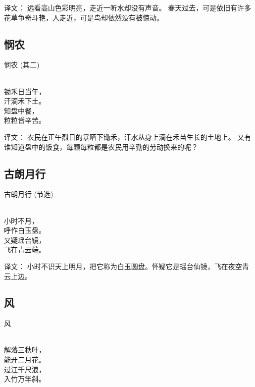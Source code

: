译文：
远看高山色彩明亮，走近一听水却没有声音。
春天过去，可是依旧有许多花草争奇斗艳，人走近，可是鸟却依然没有被惊动。

\subsection{悯农}
\begin{pinyinscope}
	\noindent \huge 悯农 {\kaishu \large (其二) }
	
	 \\
	
	\noindent 锄禾日当午，\\汗滴禾下土。\\
	知盘中餐，\\粒粒皆辛苦。
\end{pinyinscope}

译文：
农民在正午烈日的暴晒下锄禾，汗水从身上滴在禾苗生长的土地上。
又有谁知道盘中的饭食，每颗每粒都是农民用辛勤的劳动换来的呢？

\subsection{古朗月行}
\begin{pinyinscope}
	\noindent \huge 古朗月行 {\kaishu \large (节选) }
	
	 \\
	
	\noindent 小时不月，\\呼作白玉盘。\\
	又疑瑶台镜，\\飞在青云端。
\end{pinyinscope}

译文：
小时不识天上明月，把它称为白玉圆盘。怀疑它是瑶台仙镜，飞在夜空青云上边。

\subsection{风}
\begin{pinyinscope}
	\noindent \huge 风
	
	 \\
	
	\noindent 解落三秋叶，\\能开二月花。\\
	过江千尺浪，\\入竹万竿斜。
\end{pinyinscope}

